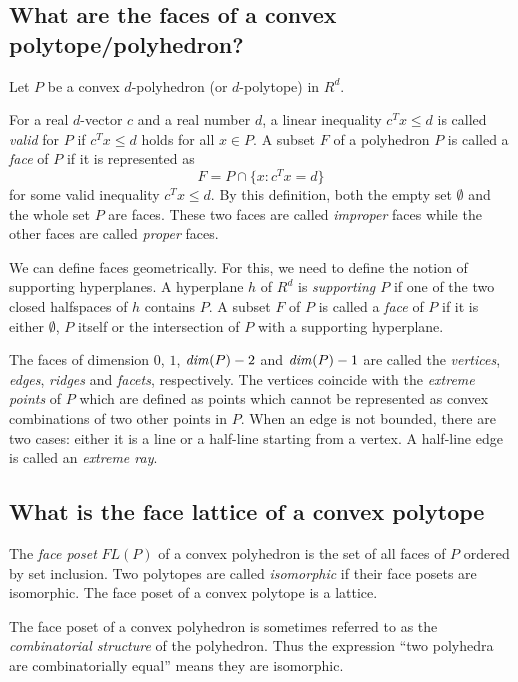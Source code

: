 \documentclass[a4paper,12pt]{article}
\def\dim{\mathop{\it dim}\nolimits}
\begin{document}
\subsection{What are the faces of a convex polytope/polyhedron?} \label{polytope:faces}

Let $P$ be a convex $d$-polyhedron (or $d$-polytope) in $R^d$.

For a real $d$-vector $c$ and a real number $d$, a linear inequality 
$c^T x \le d$ 
is called {\em valid\/} for $P$ if $c^T x \le d$ holds for all $x \in P$.
A subset $F$ of a polyhedron $P$ is called a {\em face\/} of $P$ if it is
represented as
\[
   F= P \cap \{ x:  c^Tx = d \}
\]
for some valid inequality $c^T x \le d$.  By this definition,
both the empty set $\emptyset$ and the whole set $P$ are
faces.  These two faces are called {\em improper\/} faces while the other
faces are called {\em proper\/} faces.

We can define faces geometrically.  For this, we need to
define the notion of supporting hyperplanes. 
A hyperplane $h$ of $R^d$ is {\em supporting
$P$\/} if one of the two closed halfspaces of $h$ contains $P$.   
A subset $F$ of $P$ is called a {\em face\/} of $P$ 
if it is either $\emptyset$, $P$
itself or the intersection of $P$ with a supporting hyperplane.

The faces of dimension $0$, $1$, $\dim(P)-2$ and $\dim(P)-1$ are called the {\em vertices\/},
{\em edges\/}, {\em ridges\/} and {\em facets\/}, respectively.  
The vertices coincide
with the {\em extreme points\/} of $P$ which are defined as points which cannot
be represented as convex combinations of two other points in $P$.
When an edge is not bounded, there are two cases: either it is a line
or a half-line starting from a vertex.  
A half-line edge is called an {\em extreme ray\/}.

\subsection{What is the face lattice of a convex polytope}
\label{polytope:facelattice}

The {\em face poset\/} $FL(P)$ of a convex polyhedron is 
the set of all faces of $P$ ordered by set inclusion.
Two polytopes are called {\em isomorphic\/} if
their face posets are isomorphic.  
The face poset of a convex polytope is a lattice.

The face poset of a convex polyhedron is sometimes
referred to as the {\em combinatorial structure\/} of the polyhedron.
Thus the expression ``two polyhedra are combinatorially equal''
means they are isomorphic.
\end{document}
